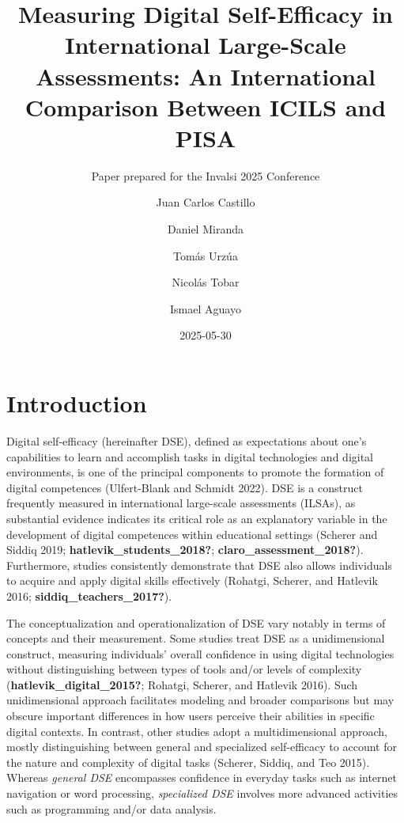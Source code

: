 \documentclass[
  letterpaper,
  DIV=11,
  numbers=noendperiod]{scrartcl}
\title{Measuring Digital Self-Efficacy in International Large-Scale
Assessments: An International Comparison Between ICILS and PISA}
\subtitle{Paper prepared for the Invalsi 2025 Conference}
\author{Juan Carlos Castillo \and Daniel Miranda \and Tomás
Urzúa \and Nicolás Tobar \and Ismael Aguayo}
\date{2025-05-30}
\begin{document}
\maketitle


\section{Introduction}\label{introduction}

Digital self-efficacy (hereinafter DSE), defined as expectations about
one's capabilities to learn and accomplish tasks in digital technologies
and digital environments, is one of the principal components to promote
the formation of digital competences (Ulfert-Blank and Schmidt 2022).
DSE is a construct frequently measured in international large-scale
assessments (ILSAs), as substantial evidence indicates its critical role
as an explanatory variable in the development of digital competences
within educational settings (Scherer and Siddiq 2019;
\textbf{hatlevik\_students\_2018?}; \textbf{claro\_assessment\_2018?}).
Furthermore, studies consistently demonstrate that DSE also allows
individuals to acquire and apply digital skills effectively (Rohatgi,
Scherer, and Hatlevik 2016; \textbf{siddiq\_teachers\_2017?}).

The conceptualization and operationalization of DSE vary notably in
terms of concepts and their measurement. Some studies treat DSE as a
unidimensional construct, measuring individuals' overall confidence in
using digital technologies without distinguishing between types of tools
and/or levels of complexity (\textbf{hatlevik\_digital\_2015?}; Rohatgi,
Scherer, and Hatlevik 2016). Such unidimensional approach facilitates
modeling and broader comparisons but may obscure important differences
in how users perceive their abilities in specific digital contexts. In
contrast, other studies adopt a multidimensional approach, mostly
distinguishing between general and specialized self-efficacy to account
for the nature and complexity of digital tasks (Scherer, Siddiq, and Teo
2015). Whereas \emph{general DSE} encompasses confidence in everyday
tasks such as internet navigation or word processing, \emph{specialized
DSE} involves more advanced activities such as programming and/or data
analysis.
\end{document}
